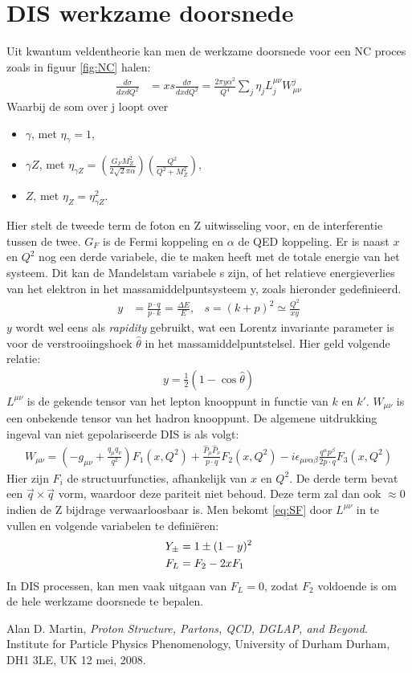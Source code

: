 \documentclass[a4paper,11pt]{article}
\numberwithin{equation}{section} %
\begin{document}
\section{DIS werkzame doorsnede} \label{app:SF}
Uit kwantum veldentheorie kan men de werkzame doorsnede voor een NC proces zoals in figuur \ref{fig:NC} halen:
\begin{align}
\frac{d\sigma}{dxdQ^2} &= xs \frac{d\sigma}{dxdQ^2} = \frac{2\pi y \alpha^2}{Q^4} \sum_j \eta_j L_j^{\mu \nu} W_{\mu \nu}^j
\end{align}
Waarbij de som over j loopt over
\begin{itemize}
  \item $\gamma$, met $\eta_\gamma=1$,
  \item $\gamma Z$, met $\eta_{\gamma Z} = \left( \frac{G_F M_Z^2}{2\sqrt{2}\pi \alpha} \right) \left(\frac{Q^2}{Q^2+M_Z^2} \right)$,
  \item $Z$, met $\eta_Z = \eta_{\gamma Z}^2$.
\end{itemize}
Hier stelt de tweede term de foton en Z uitwisseling voor, en de interferentie tussen de twee. $G_F$ is de Fermi koppeling en $\alpha$ de QED koppeling.
Er is naast $x$ en $Q^2$ nog een derde variabele, die te maken heeft met de totale energie van het systeem.
Dit kan de Mandelstam variabele s zijn, of het relatieve energieverlies van het elektron in het massamiddelpuntsysteem y, zoals hieronder gedefinieerd.
\begin{align}
y &= \frac{p \cdot q}{p \cdot k} = \frac{\Delta E}{E} ,& s = (k+p)^2 \simeq \frac{Q^2}{xy}
\end{align}
$y$ wordt wel eens als \textit{rapidity} gebruikt, wat een Lorentz invariante parameter is voor de verstrooiingshoek $\hat{\theta}$ in het massamiddelpuntstelsel.
Hier geld volgende relatie:
\begin{align}
y = \frac{1}{2} \left( 1-\cos{\hat{\theta}} \right)
\end{align}
$L^{\mu \nu}$ is de gekende tensor van het lepton knooppunt in functie van $k$ en $k'$.
$W_{\mu \nu}$ is een onbekende tensor van het hadron knooppunt.
De algemene uitdrukking ingeval van niet gepolariseerde DIS is als volgt:
\begin{align}
W_{\mu \nu} = \left( -g_{\mu \nu} + \frac{q_\mu q_\nu}{q^2} \right) F_1(x,Q^2) + \frac{\hat{P}_\mu \hat{P}_\nu}{p \cdot q} F_2(x,Q^2) -  i\epsilon_{\mu \nu \alpha \beta} \frac{q^\alpha p^\beta}{2p \cdot q} F_3(x,Q^2)
\end{align}
Hier zijn $F_i$ de structuurfuncties, afhankelijk van $x$ en $Q^2$.
De derde term bevat een $\vec{q} \times \vec{q}$ vorm, waardoor deze pariteit niet behoud.
Deze term zal dan ook $\approx 0$ indien de Z bijdrage verwaarloosbaar is.
Men bekomt \eqref{eq:SF} door $L^{\mu \nu}$ in te vullen en volgende variabelen te definiëren:
\begin{align}
Y_\pm &= 1 \pm (1-y)^2 \notag \\
F_L &= F_2 - 2x F_1 \notag
\end{align}
In DIS processen, kan men vaak uitgaan van $F_L = 0$, zodat $F_2$ voldoende is om de hele werkzame doorsnede te bepalen.


\newpage
\begin{thebibliography}{99}

  Alan D. Martin,
  \emph{Proton Structure, Partons, QCD, DGLAP, and Beyond}.
  Institute for Particle Physics Phenomenology,
  University of Durham
  Durham, DH1 3LE, UK
  12 mei, 2008.

\end{thebibliography}
\end{document}
